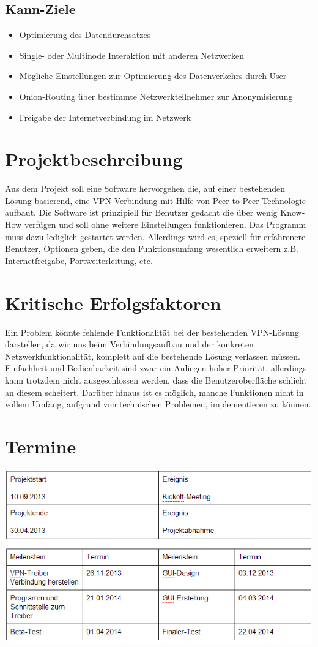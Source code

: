 \documentclass[a4paper,12pt]{scrreprt}
\begin{document}
	\subsection*{Kann-Ziele}
	\begin{itemize}
	\item Optimierung des Datendurchsatzes
	\item Single- oder Multinode Interaktion mit anderen Netzwerken
	\item Mögliche Einstellungen zur Optimierung des Datenverkehrs durch User
	\item Onion-Routing über bestimmte Netzwerkteilnehmer zur Anonymisierung
	\item Freigabe der Internetverbindung im Netzwerk
	\end{itemize}	
		
	\section*{Projektbeschreibung}
		
		Aus dem Projekt soll eine Software hervorgehen die, auf einer bestehenden Lösung basierend, eine VPN-Verbindung mit Hilfe von Peer-to-Peer Technologie aufbaut. Die Software ist prinzipiell für Benutzer gedacht die über wenig Know-How verfügen und soll ohne weitere Einstellungen funktionieren. Das Programm muss dazu lediglich gestartet werden. Allerdings wird es, speziell für erfahrenere Benutzer, Optionen geben, die den Funktionsumfang wesentlich erweitern z.B. Internetfreigabe, Portweiterleitung, etc. 
			
	\section*{Kritische Erfolgsfaktoren}
		Ein Problem könnte fehlende Funktionalität bei der bestehenden VPN-Lösung darstellen, da wir uns beim Verbindungsaufbau und der konkreten Netzwerkfunktionalität, komplett auf die bestehende Lösung verlassen müssen. Einfachheit und Bedienbarkeit sind zwar ein Anliegen hoher Priorität, allerdings kann trotzdem nicht ausgeschlossen werden, dass die Benutzeroberfläche schlicht an diesem scheitert. Darüber hinaus ist es möglich, manche Funktionen nicht in vollem Umfang, aufgrund von technischen Problemen, implementieren zu können.
	\section*{Termine}
	\includegraphics{./Termine}
\end{document}
